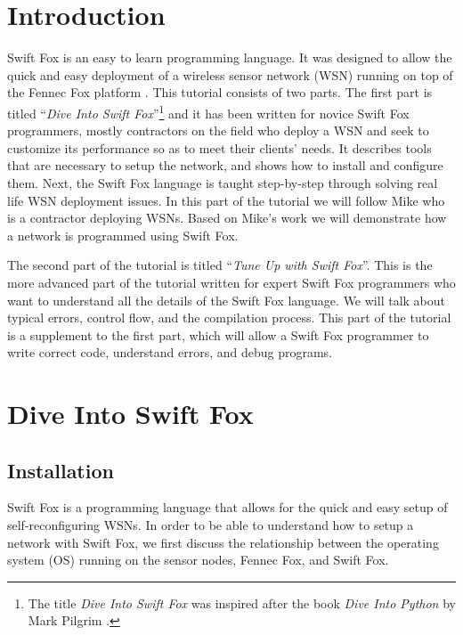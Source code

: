 \section{Introduction}
\label{sec:tutorial_introduction}

Swift Fox is an easy to learn programming language. It was designed to
allow the quick and easy deployment of a wireless sensor network (WSN)
running on top of the Fennec Fox platform \cite{marcin:whitepaper}. This
tutorial consists of two parts. The first part is titled ``\textit{Dive
Into Swift Fox}''\footnote{The title \textit{Dive Into Swift Fox} was 
inspired after the book \textit{Dive Into Python} by Mark Pilgrim
\cite{pilgrim:2004}.} and it has been written for novice Swift Fox
programmers, mostly contractors on the field who deploy a WSN and seek to 
customize its performance so as to meet their clients' needs. It describes
tools that are necessary to setup the network, and shows how to install
and configure them. Next, the Swift Fox language is taught step-by-step
through solving real life WSN deployment issues. In this part of the
tutorial we will follow Mike who is a contractor deploying WSNs. Based on
Mike's work we will demonstrate how a network is programmed using Swift
Fox.

The second part of the tutorial is titled ``\textit{Tune Up with Swift
Fox}''. This is the more advanced part of the tutorial written for expert
Swift Fox programmers who want to understand all the details of the
Swift Fox language. We will talk about typical errors, control flow, and
the compilation process. This part of the tutorial is a supplement to the
first part, which will allow a Swift Fox programmer to write correct code, 
understand errors, and debug programs.

\newpage
\section{Dive Into Swift Fox}

\subsection{Installation}
\label{sec:installation}

Swift Fox is a programming language that allows for the quick and easy
setup of self-reconfiguring WSNs. In order to be able to understand how to 
setup a network with Swift Fox, we first discuss the relationship between
the operating system (OS) running on the sensor nodes, Fennec Fox, and
Swift Fox.


